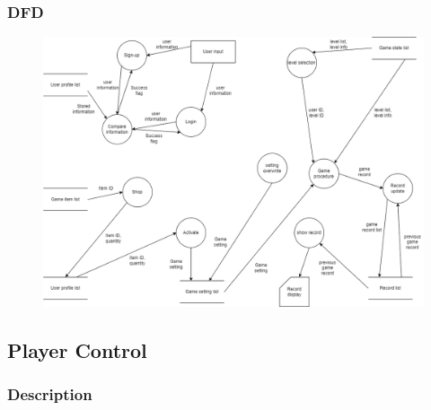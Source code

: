 \documentclass{article}
\begin{document}
\subsubsection{DFD}
\begin{figure}[H]
    \centering
    \includegraphics*[scale=0.3]{gameflow_DFD.png}
\end{figure}

\subsection{Player Control}
\subsubsection{Description}
\end{document}
